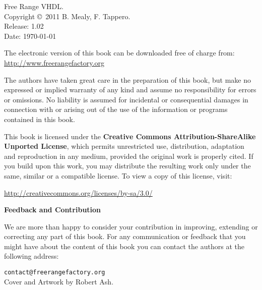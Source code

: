 %
%
%
\setcounter{page}{1}

\small
\noindent
Free Range VHDL.\\
Copyright \copyright \ 2011 B. Mealy, F. Tappero.\\
Release: 1.02\\
Date: \today
\vspace{20pt}

\noindent
The electronic version of this book can be downloaded free of charge from:\\ 
\url{http://www.freerangefactory.org}\\

\vspace{20pt}

\noindent
The authors have taken great care in the preparation of this book, but make no expressed or implied warranty of any kind and assume no responsibility for errors or omissions. No liability is assumed for incidental or consequential damages in connection with or arising out of the use of the information or programs contained in this book.

\noindent
This book is licensed under the \textbf{Creative Commons Attribution-ShareAlike Unported License}, which permits unrestricted use, distribution, adaptation and reproduction in any medium, provided the original work is properly cited. If you build upon this work, you may distribute the resulting work only under the same, similar or a compatible license. To view a copy of this license, visit:
\vspace{5pt}

\noindent
\url{http://creativecommons.org/licenses/by-sa/3.0/}
\vspace{20pt}

\noindent
{\sffamily\bfseries Feedback and Contribution}

\noindent
We are more than happy to consider your contribution in improving, extending or correcting any part of this book.
For any communication or feedback that you might have about the content of this book you can contact the authors at the following address:
\vspace{2pt}

\noindent
\texttt{contact@freerangefactory.org}\\

\vfill
\noindent
Cover and Artwork by Robert Ash.



